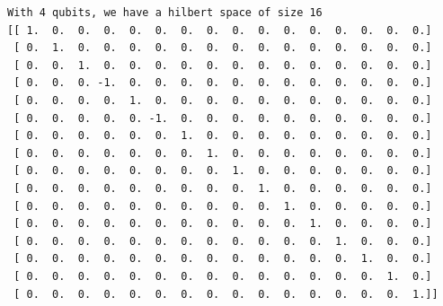     \begin{Verbatim}[commandchars=\\\{\}]
With 4 qubits, we have a hilbert space of size 16
[[ 1.  0.  0.  0.  0.  0.  0.  0.  0.  0.  0.  0.  0.  0.  0.  0.]
 [ 0.  1.  0.  0.  0.  0.  0.  0.  0.  0.  0.  0.  0.  0.  0.  0.]
 [ 0.  0.  1.  0.  0.  0.  0.  0.  0.  0.  0.  0.  0.  0.  0.  0.]
 [ 0.  0.  0. -1.  0.  0.  0.  0.  0.  0.  0.  0.  0.  0.  0.  0.]
 [ 0.  0.  0.  0.  1.  0.  0.  0.  0.  0.  0.  0.  0.  0.  0.  0.]
 [ 0.  0.  0.  0.  0. -1.  0.  0.  0.  0.  0.  0.  0.  0.  0.  0.]
 [ 0.  0.  0.  0.  0.  0.  1.  0.  0.  0.  0.  0.  0.  0.  0.  0.]
 [ 0.  0.  0.  0.  0.  0.  0.  1.  0.  0.  0.  0.  0.  0.  0.  0.]
 [ 0.  0.  0.  0.  0.  0.  0.  0.  1.  0.  0.  0.  0.  0.  0.  0.]
 [ 0.  0.  0.  0.  0.  0.  0.  0.  0.  1.  0.  0.  0.  0.  0.  0.]
 [ 0.  0.  0.  0.  0.  0.  0.  0.  0.  0.  1.  0.  0.  0.  0.  0.]
 [ 0.  0.  0.  0.  0.  0.  0.  0.  0.  0.  0.  1.  0.  0.  0.  0.]
 [ 0.  0.  0.  0.  0.  0.  0.  0.  0.  0.  0.  0.  1.  0.  0.  0.]
 [ 0.  0.  0.  0.  0.  0.  0.  0.  0.  0.  0.  0.  0.  1.  0.  0.]
 [ 0.  0.  0.  0.  0.  0.  0.  0.  0.  0.  0.  0.  0.  0.  1.  0.]
 [ 0.  0.  0.  0.  0.  0.  0.  0.  0.  0.  0.  0.  0.  0.  0.  1.]]
    \end{Verbatim}
 
            
    
    \begin{center}
    \end{center}
    { \hspace*{\fill} \\}
    


